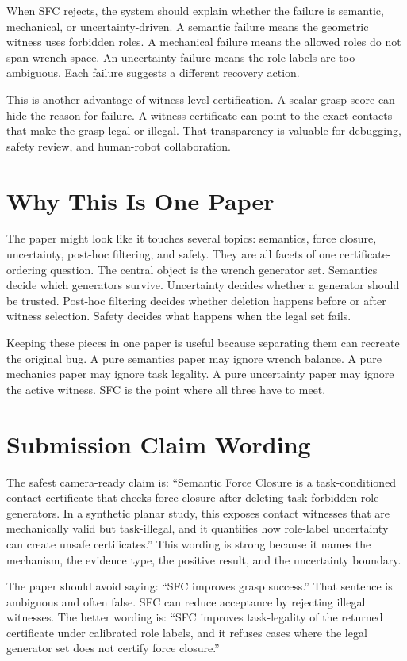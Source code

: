\documentclass{article}
\begin{document}
When SFC rejects, the system should explain whether the failure is semantic, mechanical, or uncertainty-driven. A semantic failure means the geometric witness uses forbidden roles. A mechanical failure means the allowed roles do not span wrench space. An uncertainty failure means the role labels are too ambiguous. Each failure suggests a different recovery action.

This is another advantage of witness-level certification. A scalar grasp score can hide the reason for failure. A witness certificate can point to the exact contacts that make the grasp legal or illegal. That transparency is valuable for debugging, safety review, and human-robot collaboration.

\section{Why This Is One Paper}

The paper might look like it touches several topics: semantics, force closure, uncertainty, post-hoc filtering, and safety. They are all facets of one certificate-ordering question. The central object is the wrench generator set. Semantics decide which generators survive. Uncertainty decides whether a generator should be trusted. Post-hoc filtering decides whether deletion happens before or after witness selection. Safety decides what happens when the legal set fails.

Keeping these pieces in one paper is useful because separating them can recreate the original bug. A pure semantics paper may ignore wrench balance. A pure mechanics paper may ignore task legality. A pure uncertainty paper may ignore the active witness. SFC is the point where all three have to meet.

\section{Submission Claim Wording}

The safest camera-ready claim is: ``Semantic Force Closure is a task-conditioned contact certificate that checks force closure after deleting task-forbidden role generators. In a synthetic planar study, this exposes contact witnesses that are mechanically valid but task-illegal, and it quantifies how role-label uncertainty can create unsafe certificates.'' This wording is strong because it names the mechanism, the evidence type, the positive result, and the uncertainty boundary.

The paper should avoid saying: ``SFC improves grasp success.'' That sentence is ambiguous and often false. SFC can reduce acceptance by rejecting illegal witnesses. The better wording is: ``SFC improves task-legality of the returned certificate under calibrated role labels, and it refuses cases where the legal generator set does not certify force closure.''
\end{document}
